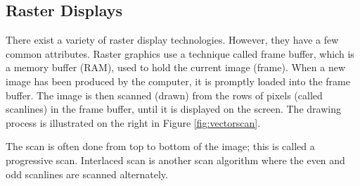 \subsection{Raster Displays}
There exist a variety of raster display technologies.
However, they have a few common attributes.
Raster graphics use a technique called frame buffer, which is a memory buffer (RAM), used to hold the current image (frame).
When a new image has been produced by the computer, it is promptly loaded into the frame buffer.
The image is then scanned (drawn) from the rows of pixels (called scanlines) in the frame buffer, until it is displayed on the screen.
The drawing process is illustrated on the right in Figure \ref{fig:vectorscan}.

The scan is often done from top to bottom of the image; this is called a progressive scan.
Interlaced scan is another scan algorithm where the even and odd scanlines are scanned alternately.
